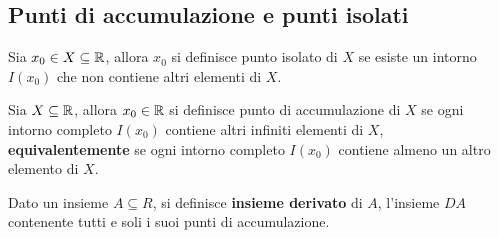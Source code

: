 \subsection{Punti di accumulazione e punti isolati}
\begin{boxdef}
    Sia $x_0\in X\subseteq\mathbb{R}$, allora $x_0$ si definisce punto isolato di $X$ se esiste un intorno $I(x_0)$ che non contiene altri elementi di $X$.
\end{boxdef}
\begin{boxdef}
    Sia $ X\subseteq\mathbb{R}$, allora $x_0\in \mathbb{R}$ si definisce punto di accumulazione di $X$ se ogni intorno completo $I(x_0)$ contiene altri infiniti elementi di $X$,\\
    \textbf{equivalentemente} se ogni intorno completo $I(x_0)$ contiene almeno un altro elemento di $X$.
\end{boxdef}
\begin{boxdef}
    Dato un insieme $A\subseteq R$, si definisce \textbf{insieme derivato} di $A$, l'insieme $DA$ contenente tutti e soli i suoi punti di accumulazione.
\end{boxdef}
